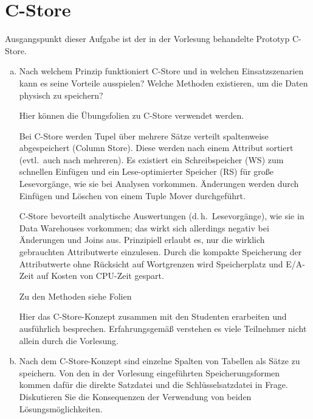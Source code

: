 \section{C-Store}

Ausgangspunkt dieser Aufgabe ist der in der Vorlesung behandelte Prototyp C-Store.

\begin{enumerate}[a)]

	\item Nach welchem Prinzip funktioniert C-Store und in welchen Einsatzszenarien kann es seine Vorteile ausspielen? Welche Methoden existieren, um die Daten physisch zu speichern?

	\begin{note}
	Hier können die Übungsfolien zu C-Store verwendet werden.
	\end{note}

	\begin{solution}
	Bei C-Store werden Tupel über mehrere Sätze verteilt spaltenweise abgespeichert (Column Store). Diese werden nach einem Attribut sortiert (evtl.\ auch nach mehreren). Es existiert ein Schreibspeicher (WS) zum schnellen Einfügen und ein Lese-optimierter Speicher (RS) für große Lesevorgänge, wie sie bei Analysen vorkommen. Änderungen werden durch Einfügen und Löschen von einem Tuple Mover durchgeführt.

	C-Store bevorteilt analytische Auswertungen (d.\,h.\ Lesevorgänge), wie sie in Data Warehouses vorkommen; das wirkt sich allerdings negativ bei Änderungen und Joins aus. Prinzipiell erlaubt es, nur die wirklich gebrauchten Attributwerte einzulesen. Durch die kompakte Speicherung der Attributwerte ohne Rücksicht auf Wortgrenzen wird Speicherplatz und E/A-Zeit auf Kosten von CPU-Zeit gespart.

	Zu den Methoden siehe Folien~\CStoreMethode %
	\end{solution}

	\begin{note}
	Hier das C-Store-Konzept zusammen mit den Studenten erarbeiten und ausführlich besprechen.
	Erfahrungsgemäß verstehen es viele Teilnehmer nicht allein durch die Vorlesung.
	\end{note}

	\item Nach dem C-Store-Konzept sind einzelne Spalten von Tabellen als Sätze zu speichern. Von den in der Vorlesung eingeführten Speicherungsformen kommen dafür die direkte Satzdatei und die Schlüsselsatzdatei in Frage. Diskutieren Sie die Konsequenzen der Verwendung von beiden Lösungsmöglichkeiten.


\end{enumerate}
